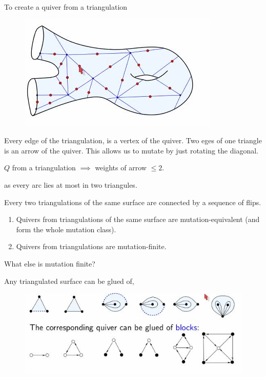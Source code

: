 \documentclass{article}
\begin{document}
To create a quiver from a triangulation

\begin{figure}[!ht]
\centering
\includegraphics{./figures/L3.7}
\caption{}
\end{figure}

Every edge of the triangulation, is a vertex of the quiver. Two eges of one triangle is an arrow of the quiver. This allows us to mutate by just rotating the diagonal.

\begin{remark}
  $Q$ from a triangulation $\implies$ weights of arrow $\le 2$.
\end{remark}
as every arc lies at most in two triangules.

\begin{nthm}[Hatcher 1991]
  Every two triangulations of the same surface are connected by a sequence of flips.
\end{nthm}

\begin{ncor}
 \begin{enumerate}
   \item Quivers from triangulations of the same surface are mutation-equivalent (and form the whole mutation class).
   \item Quivers from triangulations are mutation-finite.
 \end{enumerate}
\end{ncor}

\begin{question}
  What else is mutation finite?
\end{question}

Any triangulated surface can be glued of,
\begin{figure}[!ht]
\centering
\includegraphics{./figures/L3.8}
\caption{}
\end{figure}
\end{document}

